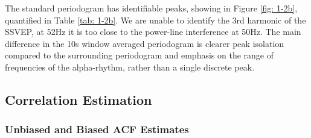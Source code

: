 \documentclass[12pt]{article}
\numberwithin{equation}{section}
\begin{document}
	The standard periodogram has identifiable peaks, showing in Figure \ref{fig: 1-2b}, quantified in Table \ref{tab: 1-2b}. We are unable to identify the 3rd harmonic of the SSVEP, at 52Hz it is too close to the power-line interference at 50Hz. The main difference in the 10s window averaged periodogram is clearer peak isolation compared to the surrounding periodogram and emphasis on the range of frequencies of the alpha-rhythm, rather than a single discrete peak.

	\subsection{Correlation Estimation} \label{sec: 1-3-correlation-est}
	
	\subsubsection{Unbiased and Biased ACF Estimates}
	
\end{document}
